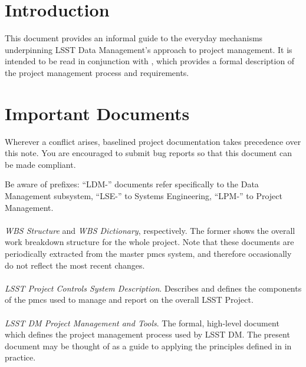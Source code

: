 \section{Introduction}

This document provides an informal guide to the everyday mechanisms underpinning LSST Data Management's approach to project management.
It is intended to be read in conjunction with , which provides a formal description of the project management process and requirements.

\section{Important Documents}
\label{sec:documents}

Wherever a conflict arises, baselined project documentation takes precedence over this note.
You are encouraged to submit bug reports so that this document can be made compliant.

Be aware of prefixes: ``LDM-'' documents refer specifically to the Data Management subsystem, ``LSE-'' to Systems Engineering, ``LPM-'' to Project Management.

\paragraph*{}
\emph{WBS Structure} and \emph{WBS Dictionary}, respectively.
The former shows the overall work breakdown structure for the whole project.
Note that these documents are periodically extracted from the master \gls{pmcs} system, and therefore occasionally do not reflect the most recent changes.

\paragraph*{}
\emph{LSST Project Controls System Description}.
Describes and defines the components of the \gls{pmcs} used to manage and report on the overall LSST Project.

\paragraph*{}
\emph{LSST DM Project Management and Tools}.
The formal, high-level document which defines the project management process used by LSST DM.
The present document may be thought of as a guide to applying the principles defined in  in practice.

